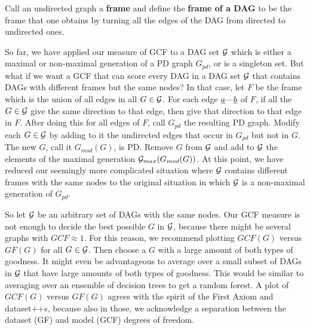 \documentclass[12pt]{article}
\begin{document}
Call an undirected graph a {\bf frame}
and define the
{\bf frame of a DAG}
to be the frame that one obtains
by turning
all the edges of the DAG from directed 
to undirected ones.

So far, we 
have applied our measure of
GCF to a DAG set ${\cal G}$
which is
either a maximal or 
non-maximal generation
of  a PD graph $G_{pd}$,
or is a singleton set.
But what if we want a GCF
that can score every DAG
in a  DAG set
${\cal G}$ that contains
DAGs with different frames
but the same nodes?
In that case, 
let $F$
be the frame
which 
is the union of 
all edges in all $G\in {\cal G}$.
For each edge ${\underline{a}}\text{---}{\underline{b}}$ of $F$,
if all the $G\in {\cal G}$
give the same direction
to that edge, then give that direction
to that edge in $F$.
After doing this for
all edges of $F$,
call $G_{pd} $ the resulting 
PD graph.
Modify each $G\in {\cal G}$
by adding to it the undirected edges
that occur in $G_{pd}$
but not in $G$.
The new $G$, call it $G_{mod}(G)$,
is PD. Remove $G$ from ${\cal G}$
and add to ${\cal G}$
the elements of
the maximal generation ${\cal G}_{max}(G_{mod}(G))$.
At this point,
we have reduced our
seemingly more 
complicated situation
where ${\cal G}$ contains
different frames with the same nodes
to the original situation
in which ${\cal G}$
is a non-maximal 
generation of $G_{pd}$.



So let ${\cal G}$
be an arbitrary set of
DAGs with the same nodes.
Our GCF  measure
is not enough to
decide the best 
possible $G$ in ${\cal G}$,
because there might 
be several graphs with 
$GCF\approx 1$.
For this reason,
we recommend
plotting $GCF(G)$ 
versus $GF(G)$
for all $G\in{\cal G}$.
Then  choose a $G$ with a
large amount
of both types of goodness.
It might even be
advantageous to average over
a small subset of DAGs in  ${\cal G}$
that have large amounts of both
types of goodness.
This would be similar to  averaging
over an ensemble of decision trees to get 
a random forest.
A plot of 
$GCF(G)$
versus $GF(G)$
agrees with the spirit of
the First 
Axiom and dataset++s,
because also in those,
we acknowledge a separation between the
dataset (GF)  and model (GCF) degrees of freedom.



\end{document}
